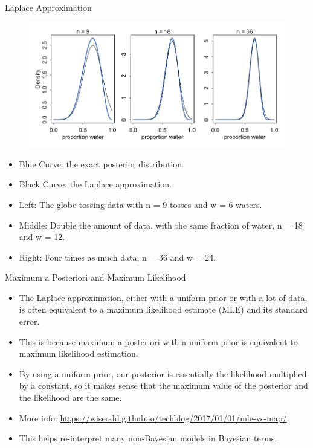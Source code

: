 \documentclass[handout]{beamer}
\begin{document}
\begin{frame}{Laplace Approximation}
\scriptsize{

\begin{figure}[h!]
	\centering
	\includegraphics[scale=0.3]{pics/quadratic.png}
\end{figure}
 
\begin{itemize}
 \item Blue Curve: the exact posterior distribution. 
 \item Black Curve: the Laplace approximation.
 \item Left: The globe tossing data with n = 9 tosses and w = 6 waters.
 \item Middle: Double the amount of data, with the same fraction of water, n = 18 and w = 12.
 \item Right: Four times as much data, n = 36 and w = 24.
\end{itemize}


} 

\end{frame}


\begin{frame}{Maximum a Posteriori and Maximum Likelihood}
\scriptsize{

\begin{itemize}
\item The Laplace approximation, either with a uniform prior or with a lot of data, is often equivalent to a maximum likelihood estimate (MLE) and its standard error.
\item This is because maximum a posteriori with a uniform prior is equivalent to maximum likelihood estimation.
\item By using a uniform prior, our posterior is essentially the likelihood multiplied by a constant, so it makes sense that the maximum value of the posterior and the likelihood are the same.
\item More info: \url{https://wiseodd.github.io/techblog/2017/01/01/mle-vs-map/}.
\item This helps re-interpret many non-Bayesian models in Bayesian terms.
\end{itemize}


} 
\end{frame}
\end{document}
